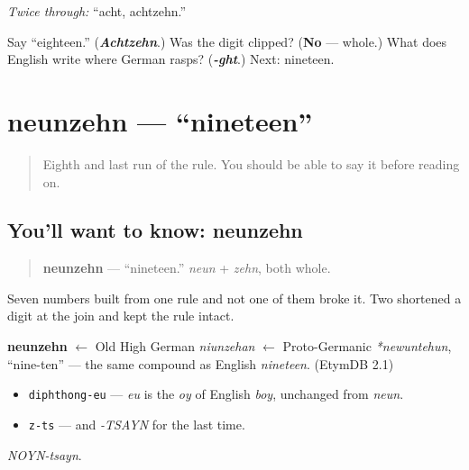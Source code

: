 \emph{Twice through:} \textquotedblleft{}acht, achtzehn.\textquotedblright{}

\begin{tcolorbox}[breakable,colback=teal!4,colframe=teal!35!black,title={Before you move on}]
Say \textquotedblleft{}eighteen.\textquotedblright{} (\emph{\textbf{Achtzehn}}.) Was the digit clipped? (\textbf{No} — whole.) What does English write where German rasps? (\emph{\textbf{-ght}}.) Next: nineteen.
\end{tcolorbox}
\section[neunzehn]{neunzehn — \textquotedblleft{}nineteen\textquotedblright{}}

\label{lesson:GE-C12-neunzehn}



\begin{quote}
Eighth and last run of the rule. You should be able to say it before reading on.
\end{quote}

\subsection*{You'll want to know: neunzehn}
\begin{quote}
\textbf{neunzehn} — \textquotedblleft{}nineteen.\textquotedblright{} \emph{neun} + \emph{zehn}, both whole.
\end{quote}

Seven numbers built from one rule and not one of them broke it. Two shortened a digit at the join and kept the rule intact.

\begin{cousinweb}
\textbf{neunzehn} $\leftarrow$ Old High German \emph{niunzehan} $\leftarrow$ Proto-Germanic \emph{*newuntehun}, \textquotedblleft{}nine-ten\textquotedblright{} — the same compound as English \emph{nineteen}. (EtymDB 2.1)
\end{cousinweb}

\begin{sounds}
\begin{itemize}
\raggedright
  \item \texttt{diphthong-eu} — \emph{eu} is the \emph{oy} of English \emph{boy}, unchanged from \emph{neun}.
  \item \texttt{z-ts} — and \emph{-TSAYN} for the last time.
\end{itemize}

\emph{NOYN-tsayn}.
\end{sounds}

